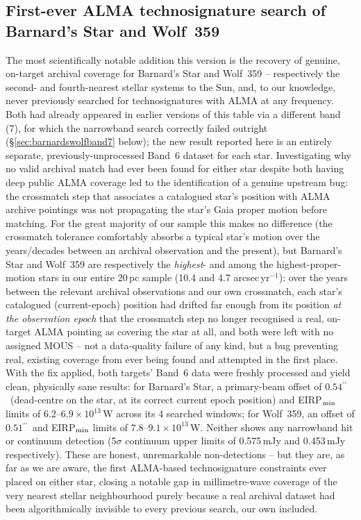 \documentclass{openjournal}
\begin{document}
\subsection{First-ever ALMA technosignature search of Barnard's Star and
Wolf~359}
\label{sec:barnardswolf}

The most scientifically notable addition this version is the recovery of
genuine, on-target archival coverage for Barnard's Star and Wolf~359 --
respectively the second- and fourth-nearest stellar systems to the Sun,
and, to our knowledge, never previously searched for technosignatures
with ALMA at any frequency. Both had already appeared in earlier versions
of this table via a different band (7), for which the narrowband search
correctly failed outright (\S\ref{sec:barnardswolfband7} below); the new
result reported here is an entirely separate, previously-unprocessed
Band~6 dataset for each star. Investigating why no valid archival match
had ever been found for either star despite both having deep public ALMA
coverage led to the identification of a genuine upstream bug: the
crossmatch step that associates a catalogued star's position with ALMA
archive pointings was not propagating the star's Gaia proper motion
before matching. For the great majority of our sample this makes no
difference (the crossmatch tolerance comfortably absorbs a typical star's
motion over the years/decades between an archival observation and the
present), but Barnard's Star and Wolf~359 are respectively the
\emph{highest}- and among the highest-proper-motion stars in our entire
20\,pc sample (10.4 and 4.7 arcsec\,yr$^{-1}$): over the years between the
relevant archival observations and our own crossmatch, each star's
catalogued (current-epoch) position had drifted far enough from its
position \emph{at the observation epoch} that the crossmatch step no
longer recognised a real, on-target ALMA pointing as covering the star at
all, and both were left with no assigned MOUS -- not a data-quality
failure of any kind, but a bug preventing real, existing coverage from
ever being found and attempted in the first place. With the fix applied,
both targets' Band~6 data were freshly processed and yield clean,
physically sane results: for Barnard's Star, a primary-beam offset of
$0.54$\hbox{$^{\prime\prime}$}\ (dead-centre on the star, at its correct
current epoch position) and EIRP$_{\rm min}$ limits of
$6.2$--$6.9\times10^{13}$\,W across its 4 searched windows; for Wolf~359,
an offset of $0.51$\hbox{$^{\prime\prime}$}\ and EIRP$_{\rm min}$ limits of
$7.8$--$9.1\times10^{13}$\,W. Neither shows any narrowband hit or
continuum detection (5$\sigma$ continuum upper limits of 0.575\,mJy and
0.453\,mJy respectively). These are honest, unremarkable non-detections
-- but they are, as far as we are aware, the first ALMA-based
technosignature constraints ever placed on either star, closing a
notable gap in millimetre-wave coverage of the very nearest stellar
neighbourhood purely because a real archival dataset had been
algorithmically invisible to every previous search, our own included.
\end{document}
